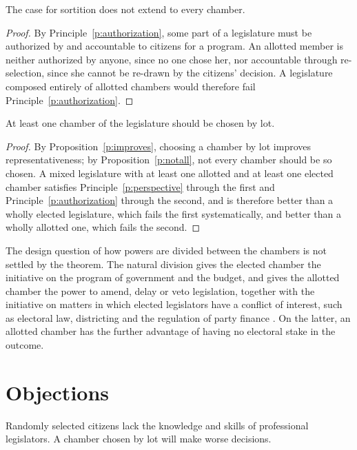 \documentclass{situationist-preprint}
\begin{document}
\begin{proposition}\label{p:notall}
The case for sortition does not extend to every chamber.
\end{proposition}

\begin{proof}
By Principle~\ref{p:authorization}, some part of a legislature must be authorized by and accountable to citizens for a program. An allotted member is neither authorized by anyone, since no one chose her, nor accountable through re-selection, since she cannot be re-drawn by the citizens' decision. A legislature composed entirely of allotted chambers would therefore fail Principle~\ref{p:authorization}.
\end{proof}

\begin{theorem}\label{t:main}
At least one chamber of the legislature should be chosen by lot.
\end{theorem}

\begin{proof}
By Proposition~\ref{p:improves}, choosing a chamber by lot improves representativeness; by Proposition~\ref{p:notall}, not every chamber should be so chosen. A mixed legislature with at least one allotted and at least one elected chamber satisfies Principle~\ref{p:perspective} through the first and Principle~\ref{p:authorization} through the second, and is therefore better than a wholly elected legislature, which fails the first systematically, and better than a wholly allotted one, which fails the second.
\end{proof}

The design question of how powers are divided between the chambers is not settled by the theorem. The natural division gives the elected chamber the initiative on the program of government and the budget, and gives the allotted chamber the power to amend, delay or veto legislation, together with the initiative on matters in which elected legislators have a conflict of interest, such as electoral law, districting and the regulation of party finance \citep{Abizadeh2021}. On the latter, an allotted chamber has the further advantage of having no electoral stake in the outcome.

\section{Objections}

\begin{objection}[Competence]
Randomly selected citizens lack the knowledge and skills of professional legislators. A chamber chosen by lot will make worse decisions.
\end{objection}
\end{document}
